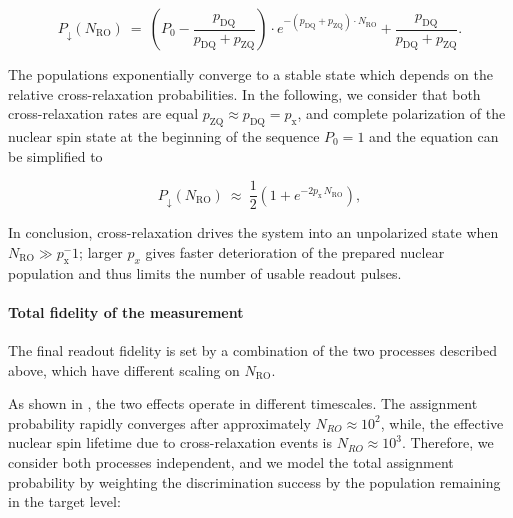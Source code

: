 \begin{equation}
    P_\downarrow(N_\mathrm{RO}) \: = \: (P_0 - \frac{p_\text{DQ}}{p_\text{DQ} + p_\text{ZQ}})\cdot e^{-(p_\text{DQ} + p_\text{ZQ})\cdot N_\mathrm{RO}} + \frac{p_\text{DQ}}{p_\text{DQ} + p_\text{ZQ}}.
\end{equation}

The populations exponentially converge to a stable state which depends on the relative cross-relaxation probabilities. In the following, we consider that both cross-relaxation rates are equal $p_\text{ZQ} \approx p_\text{DQ} = p_\text{x}$, and complete polarization of the nuclear spin state at the beginning of the sequence $P_0=1$ and the equation can be simplified to

\begin{equation}
    P_\downarrow(N_\mathrm{RO}) \: \approx \: \frac{1}{2}\left( 1 + e^{- 2 p_\text{x} \, N_\mathrm{RO}}\right), 
\end{equation}

In conclusion, cross-relaxation drives the system into an unpolarized state when $N_\mathrm{RO} \gg p_\text{x}^-1$; larger $p_x$ gives faster deterioration of the prepared nuclear population and thus limits the number of usable readout pulses.

\paragraph{Total fidelity of the measurement} The final readout fidelity is set by a combination of the two processes described above, which have different scaling on $N_\mathrm{RO}$. %

As shown in , the two effects operate in different timescales. The assignment probability rapidly converges after approximately $N_{RO}\approx10^2$, while, the effective nuclear spin lifetime due to cross-relaxation events is $N_{RO}\approx10^3$. Therefore, we consider both processes independent, and we model the total assignment probability by weighting the discrimination success by the population remaining in the target level:

